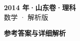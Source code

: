 \documentclass[zihao=-4, a4paper]{ctexart}
\begin{document}
\begin{center}
  {\Large\bfseries 2014 年·山东卷·理科}\\[4pt]
  {\large 数学 · 解析版}
\end{center}
\medskip
{}

\clearpage
{}
\begin{center}{\Large\bfseries 参考答案与详细解析}\end{center}
\medskip

\end{document}

